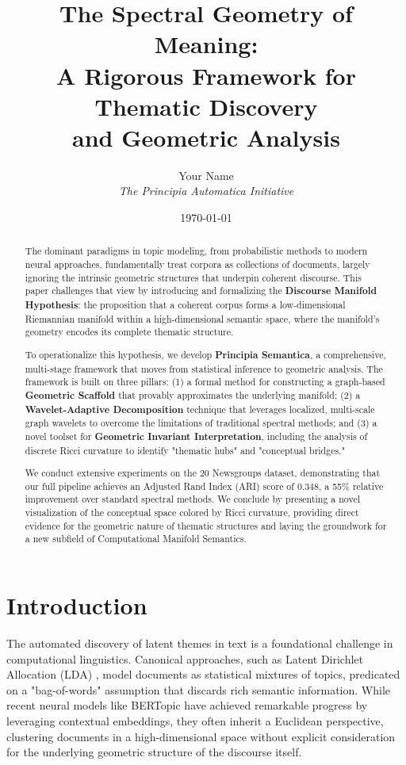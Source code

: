 \documentclass[11pt, letterpaper]{article}
\title{\textbf{The Spectral Geometry of Meaning: \\ A Rigorous Framework for Thematic Discovery \\ and Geometric Analysis}}
\author{Your Name \\ \textit{The Principia Automatica Initiative}}
\date{\today}
\begin{document}
\maketitle

\begin{abstract}
    The dominant paradigms in topic modeling, from probabilistic methods to modern neural approaches, fundamentally treat corpora as collections of documents, largely ignoring the intrinsic geometric structures that underpin coherent discourse. This paper challenges that view by introducing and formalizing the \textbf{Discourse Manifold Hypothesis}: the proposition that a coherent corpus forms a low-dimensional Riemannian manifold within a high-dimensional semantic space, where the manifold's geometry encodes its complete thematic structure. 
    
    To operationalize this hypothesis, we develop \textbf{Principia Semantica}, a comprehensive, multi-stage framework that moves from statistical inference to geometric analysis. The framework is built on three pillars: (1) a formal method for constructing a graph-based \textbf{Geometric Scaffold} that provably approximates the underlying manifold; (2) a \textbf{Wavelet-Adaptive Decomposition} technique that leverages localized, multi-scale graph wavelets to overcome the limitations of traditional spectral methods; and (3) a novel toolset for \textbf{Geometric Invariant Interpretation}, including the analysis of discrete Ricci curvature to identify "thematic hubs" and "conceptual bridges."
    
    We conduct extensive experiments on the 20 Newsgroups dataset, demonstrating that our full pipeline achieves an Adjusted Rand Index (ARI) score of 0.348, a 55\% relative improvement over standard spectral methods. We conclude by presenting a novel visualization of the conceptual space colored by Ricci curvature, providing direct evidence for the geometric nature of thematic structures and laying the groundwork for a new subfield of Computational Manifold Semantics.
\end{abstract}

\newpage
\tableofcontents
\newpage

\section{Introduction}
The automated discovery of latent themes in text is a foundational challenge in computational linguistics. Canonical approaches, such as Latent Dirichlet Allocation (LDA) \cite{blei2003latent}, model documents as statistical mixtures of topics, predicated on a "bag-of-words" assumption that discards rich semantic information. While recent neural models like BERTopic \cite{grootendorst2022bertopic} have achieved remarkable progress by leveraging contextual embeddings, they often inherit a Euclidean perspective, clustering documents in a high-dimensional space without explicit consideration for the underlying geometric structure of the discourse itself.
\end{document}
